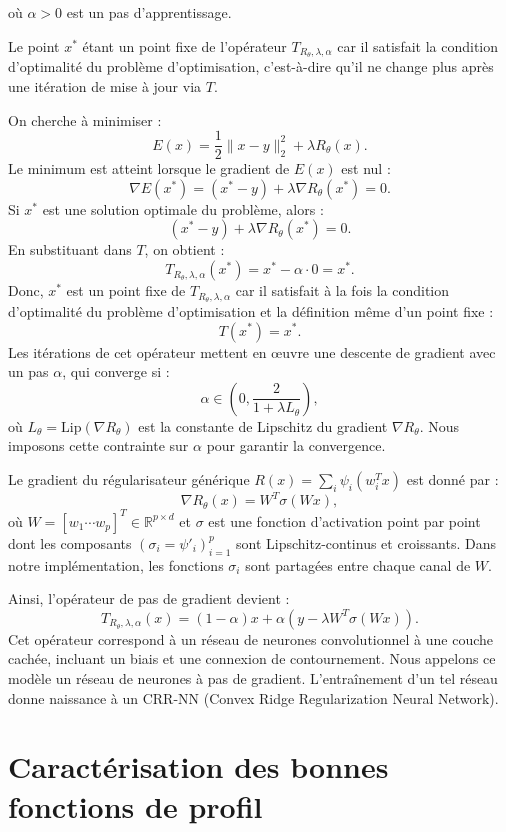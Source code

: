 \documentclass[a4paper, 12pt]{report} %
\begin{document}
où \( \alpha > 0 \) est un pas d’apprentissage.

Le point \( x^* \) étant un point fixe de l’opérateur \( T_{R_\theta,\lambda,\alpha} \) car il satisfait la condition d'optimalité du problème d'optimisation, c'est-à-dire qu'il ne change plus après une itération de mise à jour via \( T \).

\hspace{-0.7 cm}On cherche à minimiser : 
\[
E(x) = \frac{1}{2} \| x - y \|_2^2 + \lambda R_\theta(x).
\]
Le minimum est atteint lorsque le gradient de \( E(x) \) est nul :
\[
\nabla E(x^*) = (x^* - y) + \lambda \nabla R_\theta(x^*) = 0.
\]
Si \( x^* \) est une solution optimale du problème, alors :
\[
(x^* - y) + \lambda \nabla R_\theta(x^*) = 0.
\]
En substituant dans \( T \), on obtient :
\[
T_{R_\theta,\lambda,\alpha}(x^*) = x^* - \alpha \cdot 0 = x^*.
\]
Donc, \( x^* \) est un point fixe de \( T_{R_\theta,\lambda,\alpha} \) car il satisfait à la fois la condition d'optimalité du problème d'optimisation et la définition même d’un point fixe : 
\[
T(x^*) = x^*.
\]
Les itérations de cet opérateur mettent en œuvre une descente de gradient avec un pas \( \alpha \), qui converge si :  
\[
\alpha \in \left(0, \frac{2}{1 + \lambda L_\theta}\right),
\]
où \( L_\theta = \text{Lip}(\nabla R_\theta) \) est la constante de Lipschitz du gradient \( \nabla R_\theta \). Nous imposons cette contrainte sur \( \alpha \) pour garantir la convergence.

\hspace{-0.7 cm}Le gradient du régularisateur générique \( R(x) = \sum_{i} \psi_i(w_i^T x) \) est donné par :  
\[
\nabla R_\theta(x) = W^T \sigma(Wx),
\]
où \( W = [w_1 \cdots w_p]^T \in \mathbb{R}^{p \times d} \) et \( \sigma \) est une fonction d’activation point par point dont les composants \( (\sigma_i = \psi'_i)_{i=1}^p \) sont Lipschitz-continus et croissants. Dans notre implémentation, les fonctions \( \sigma_i \) sont partagées entre chaque canal de \( W \).

Ainsi, l’opérateur de pas de gradient devient :  
\[
T_{R_\theta,\lambda,\alpha}(x) = (1 - \alpha)x + \alpha \left( y - \lambda W^T \sigma(Wx) \right).
\]
Cet opérateur correspond à un réseau de neurones convolutionnel à une couche cachée, incluant un biais et une connexion de contournement. Nous appelons ce modèle un réseau de neurones à pas de gradient. L’entraînement d’un tel réseau donne naissance à un CRR-NN (Convex Ridge Regularization Neural Network).

\section{Caractérisation des bonnes fonctions de profil}
\end{document}
